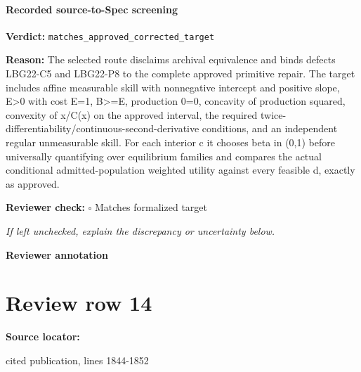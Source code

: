 \documentclass[10pt]{article}
\newcommand{\reviewerbox}{%
  \par\noindent\fbox{\parbox{0.96\linewidth}{\rule{0pt}{0.38in}}}\par
}
\newcommand{\reviewmatch}[1]{%
  \par\noindent\textbf{Reviewer check:} $\square$\; #1\par
  \noindent\emph{If left unchecked, explain the discrepancy or uncertainty below.}\par
}
\begin{document}
\paragraph{Recorded source-to-Spec screening}
\textbf{Verdict:} \texttt{matches\_approved\_corrected\_target}
\\
{\raggedright
\textbf{Reason:} The selected route disclaims archival equivalence and binds defects LBG22-\allowbreak{}C5 and LBG22-\allowbreak{}P8 to the complete approved primitive repair.\allowbreak{} The target includes affine measurable skill with nonnegative intercept and positive slope, E>0 with cost E=1, B>=E, production 0=0, concavity of production squared, convexity of x/\allowbreak{}C(x) on the approved interval, the required twice-\allowbreak{}differentiability/\allowbreak{}continuous-\allowbreak{}second-\allowbreak{}derivative conditions, and an independent regular unmeasurable skill.\allowbreak{} For each interior c it chooses beta in (0,1) before universally quantifying over equilibrium families and compares the actual conditional admitted-\allowbreak{}population weighted utility against every feasible d, exactly as approved.\allowbreak{}
\par}
\reviewmatch{Matches formalized target}
\noindent\textbf{Reviewer annotation}\par
\reviewerbox
\clearpage
\hypertarget{source-claim-53bb19f6829b5622}{}
\section*{Review row 14}
\textbf{Source locator:} {\footnotesize\raggedright cited publication, lines 1844-\allowbreak{}1852\par}
\end{document}
